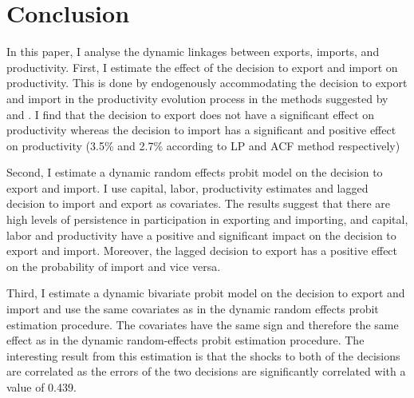 \documentclass[12pt]{article}
\begin{document}
\section{Conclusion}\label{sec:conclusion}
In this paper, I analyse the dynamic linkages between exports, imports, and productivity. First, I estimate the effect of the decision to export and import
on productivity. This is done by endogenously accommodating the
decision to export and import in the productivity evolution process in
the methods suggested by \textcite{levinsohn2003estimating} and
\textcite{ackerberg2006structural}. I find that the decision to export
does not have a significant effect on productivity whereas the
decision to import has a significant and positive effect  on
productivity (3.5\% and 2.7\% according to LP and ACF method respectively) 

Second, I estimate a dynamic random effects probit model on the
decision to export and import. I use capital, labor,  productivity
estimates and lagged decision to import and
export as covariates. The results suggest that there are high levels of persistence in participation in exporting and importing,
and capital, labor and productivity have a positive and significant
impact on the decision to export and import. Moreover, the lagged
decision to export has a positive effect on the probability of import
and vice versa. 

Third, I estimate a dynamic bivariate probit model  on the
decision to export and import and use the same covariates as in the
dynamic random effects probit estimation procedure. The covariates
have the same sign and therefore the same effect as in the dynamic
random-effects probit estimation procedure.
The interesting result from this estimation is that the shocks to both
of the decisions are
correlated as the  errors of the two decisions are
significantly correlated with a value of 0.439.   %



\end{document}
